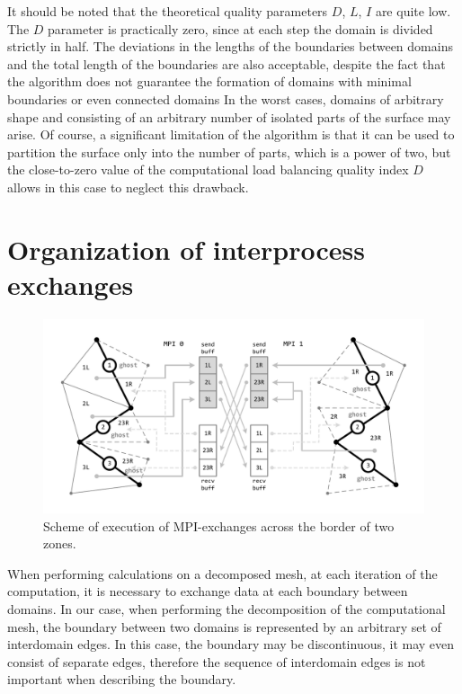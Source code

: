 \documentclass[
11pt,%
tightenlines,%
twoside,%
onecolumn,%
nofloats,%
nobibnotes,%
nofootinbib,%
superscriptaddress,%
noshowpacs,%
centertags]%
{revtex4}
\begin{document}
It should be noted that the theoretical quality parameters $ D $, $ L $, $ I $ are quite low.
The $ D $ parameter is practically zero, since at each step the domain is divided strictly in half.
The deviations in the lengths of the boundaries between domains and the total length of the boundaries are also acceptable, despite the fact that the algorithm does not guarantee the formation of domains with minimal boundaries or even connected domains
In the worst cases, domains of arbitrary shape and consisting of an arbitrary number of isolated parts of the surface may arise.
Of course, a significant limitation of the algorithm is that it can be used to partition the surface only into the number of parts, which is a power of two, but the close-to-zero value of the computational load balancing quality index $ D $ allows in this case to neglect this drawback.

\section{Organization of interprocess exchanges}

\begin{figure}[h]
\includegraphics[width=1.0\textwidth]{pics/04-MPI.pdf}
\caption{Scheme of execution of MPI-exchanges across the border of two zones.}\label{fig:04-MPI}
\end{figure}

When performing calculations on a decomposed mesh, at each iteration of the computation, it is necessary to exchange data at each boundary between domains.
In our case, when performing the decomposition of the computational mesh, the boundary between two domains is represented by an arbitrary set of interdomain edges.
In this case, the boundary may be discontinuous, it may even consist of separate edges, therefore the sequence of interdomain edges is not important when describing the boundary.
\end{document}
